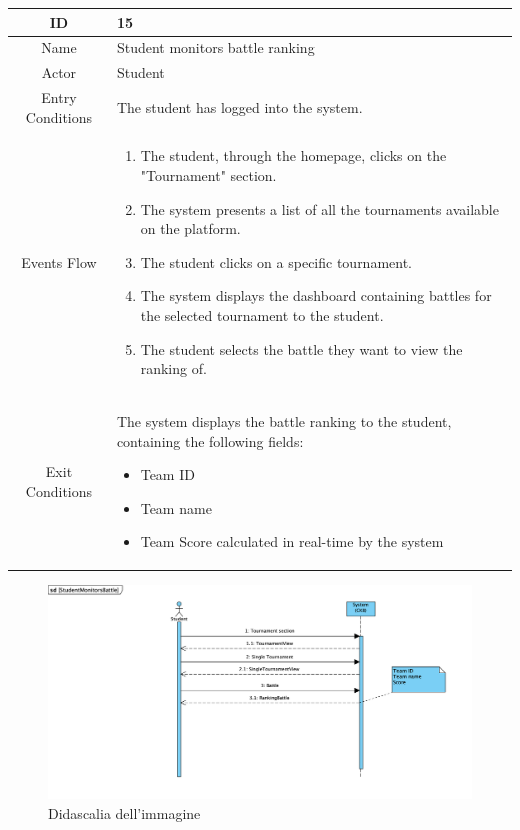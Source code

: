 \begin{longtable}{|c| p{10cm}|}
    \hline
        ID & 15 \\
    \hline
        Name & Student monitors battle ranking \\
    \hline
        Actor & Student \\
    \hline
        Entry Conditions & 

                The student has logged into the system.
\\
    \hline
        Events Flow &   \begin{enumerate}
                            \item The student, through the homepage, clicks on the "Tournament" section.
                            \item The system presents a list of all the tournaments available on the platform.
                            \item The student clicks on a specific tournament.
                            \item The system displays the dashboard containing battles for the selected tournament to the student.
                            \item The student selects the battle they want to view the ranking of.
                        \end{enumerate} \\
    \hline
        Exit Conditions &

The system displays the battle ranking to the student, containing the following fields:
            \begin{itemize}
                                \item Team ID
                                \item Team name
                                \item Team Score calculated in real-time by the system
                            \end{itemize}
\\
    \hline
\end{longtable}

    \begin{figure}[H]
  \includegraphics[width=1\linewidth]{SequenceDiagram/StudentMonitorsBattleRanking.png} 
  \caption{Didascalia dell'immagine}
  \label{fig:immagine}
\end{figure}



